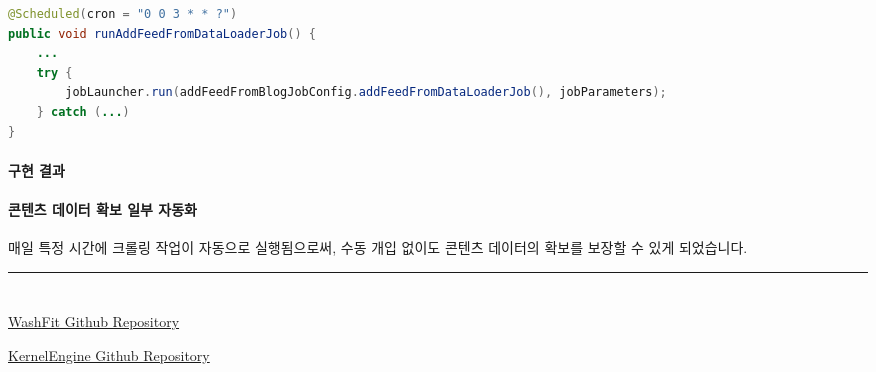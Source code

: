 \documentclass[12pt,a4paper]{article}
\newcommand{\divider}{%
    \vspace{0.5cm}%
    \begin{center}%
    \textcolor{lightgray}{\rule{0.2\textwidth}{0.5pt}}%
    \end{center}%
    \vspace{0.5cm}%
}
\begin{document}
    \begin{lstlisting}[language=Java, caption=블로그 게시글 수집 작업 예시]
@Scheduled(cron = "0 0 3 * * ?")
public void runAddFeedFromDataLoaderJob() {
    ...
    try {
        jobLauncher.run(addFeedFromBlogJobConfig.addFeedFromDataLoaderJob(), jobParameters);
    } catch (...)
}
    \end{lstlisting}


    \paragraph{구현 결과}



    \paragraph{콘텐츠 데이터 확보 일부 자동화} \par
    매일 특정 시간에 크롤링 작업이 자동으로 실행됨으로써, 수동 개입 없이도 콘텐츠 데이터의 확보를 보장할 수 있게 되었습니다.\\

    \vspace{1em}



    \divider
    \section*{}

    \begin{thebibliography}{9}

        \href{https://github.com/Kernel360/F1-WashFit-BE}{WashFit Github Repository}

        \href{https://github.com/Kernel360/E2E1-KernelEngine}{KernelEngine Github Repository}

    \end{thebibliography}
\end{document}
